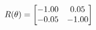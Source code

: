 \documentclass[preview]{standalone}
\begin{document}
\begin{align*}
\special{dvisvgm:raw <g id='unique000'>}R(\theta) = \begin{bmatrix}-1.00 & 0.05\\-0.05 & -1.00\end{bmatrix}\special{dvisvgm:raw </g>}
\end{align*}
\end{document}
